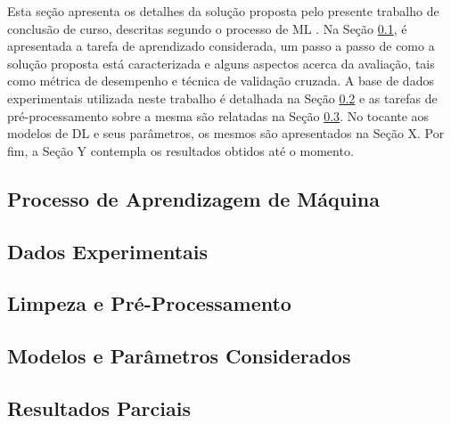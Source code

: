 Esta seção apresenta os detalhes da solução proposta pelo presente trabalho de conclusão de curso, descritas segundo o processo de ML \cite[vide Seção 1.5]{ref:marsland}. Na Seção  \ref{subsec:tarefa}, é apresentada a tarefa de aprendizado considerada, um passo a passo de como a solução proposta está caracterizada e alguns aspectos acerca da avaliação, tais como métrica de desempenho e técnica de validação cruzada. A base de dados experimentais utilizada neste trabalho é detalhada na Seção \ref{subsec:dados} e as tarefas de pré-processamento sobre a mesma são relatadas na Seção \ref{subsec:pre-process}. No tocante aos modelos de DL e seus parâmetros, os mesmos são apresentados na Seção X. Por fim, a Seção Y contempla os resultados obtidos até o momento.

\subsection{Processo de Aprendizagem de Máquina} \label{subsec:tarefa}


\subsection{Dados Experimentais} \label{subsec:dados}


\subsection{Limpeza e Pré-Processamento} \label{subsec:pre-process}


\subsection{Modelos e Parâmetros Considerados}


\subsection{Resultados Parciais} %

%
